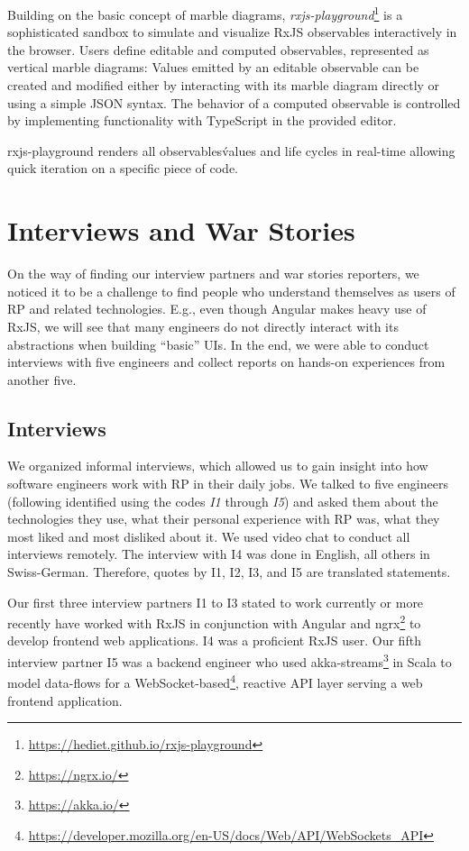 \documentclass[sigplan,screen,review]{acmart}
\begin{document}
Building on the basic concept of marble diagrams, \emph{rxjs-playground}\footnote{\url{https://hediet.github.io/rxjs-playground}} is a sophisticated sandbox to simulate and visualize RxJS observables interactively in the browser. Users define editable and computed observables, represented as vertical marble diagrams: Values emitted by an editable observable can be created and modified either by interacting with its marble diagram directly or using a simple JSON syntax. The behavior of a computed observable is controlled by implementing functionality with TypeScript in the provided editor.

rxjs-playground renders all observables\' values and life cycles in real-time allowing quick iteration on a specific piece of code.


\section{Interviews and War Stories}
\label{sec:interviews}

On the way of finding our interview partners and war stories reporters, we noticed it to be a challenge to find people who understand themselves as users of RP and related technologies. E.g., even though Angular makes heavy use of RxJS, we will see that many engineers do not directly interact with its abstractions when building ``basic'' UIs. In the end, we were able to conduct interviews with five engineers and collect reports on hands-on experiences from another five.

\subsection{Interviews}

We organized informal interviews, which allowed us to gain insight into how software engineers work with RP in their daily jobs. We talked to five engineers (following identified using the codes \emph{I1} through \emph{I5}) and asked them about the technologies they use, what their personal experience with RP was, what they most liked and most disliked about it. We used video chat to conduct all interviews remotely. The interview with I4 was done in English, all others in Swiss-German. Therefore, quotes by I1, I2, I3, and I5 are translated statements.

Our first three interview partners I1 to I3 stated to work currently or more recently have worked with RxJS in conjunction with Angular and ngrx\footnote{\url{https://ngrx.io/}} to develop frontend web applications. I4 was a proficient RxJS user. Our fifth interview partner I5 was a backend engineer who used akka-streams\footnote{\url{https://akka.io/}} in Scala to model data-flows for a WebSocket-based\footnote{\url{https://developer.mozilla.org/en-US/docs/Web/API/WebSockets_API}}, reactive API layer serving a web frontend application.
\end{document}
